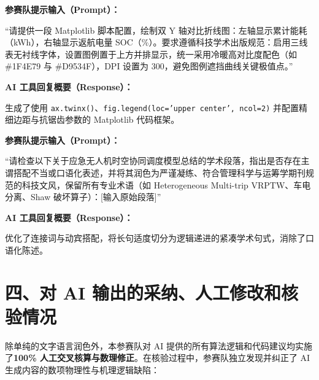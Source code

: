 \documentclass[fontset=windows, 12pt, a4paper]{ctexart}
\begin{document}
\begin{tcolorbox}[colback=cumcmgray, colframe=cumcmblue, title={\bfseries 典型交互示例 2：Matplotlib 学术图表配色与图例布局提示}]
  \textbf{参赛队提示输入（Prompt）：}\par
  “请提供一段 Matplotlib 脚本配置，绘制双 Y 轴对比折线图：左轴显示累计能耗（kWh），右轴显示返航电量 SOC（\%）。要求遵循科技学术出版规范：启用三线表无衬线字体，设置图例置于上方并排显示，统一采用冷暖高对比度配色（如 \#1F4E79 与 \#D9534F），DPI 设置为 300，避免图例遮挡曲线关键极值点。”\par
  \smallskip
  \textbf{AI 工具回复概要（Response）：}\par
  生成了使用 \texttt{ax.twinx()}、\texttt{fig.legend(loc='upper center', ncol=2)} 并配置精细边距与抗锯齿参数的 Matplotlib 代码框架。
\end{tcolorbox}

\begin{tcolorbox}[colback=cumcmgray, colframe=cumcmblue, title={\bfseries 典型交互示例 3：论文叙事逻辑与语言润色提示}]
  \textbf{参赛队提示输入（Prompt）：}\par
  “请检查以下关于应急无人机时空协同调度模型总结的学术段落，指出是否存在主谓搭配不当或口语化表述，并将其润色为严谨凝练、符合管理科学与运筹学期刊规范的科技文风，保留所有专业术语（如 Heterogeneous Multi-trip VRPTW、车电分离、Shaw 破坏算子）：[输入原始段落]”\par
  \smallskip
  \textbf{AI 工具回复概要（Response）：}\par
  优化了连接词与动宾搭配，将长句适度切分为逻辑递进的紧凑学术句式，消除了口语化陈述。
\end{tcolorbox}

\section*{四、对 AI 输出的采纳、人工修改和核验情况}

除单纯的文字语言润色外，本参赛队对 AI 提供的所有算法逻辑和代码建议均实施了\textbf{100\% 人工交叉核算与数理修正}。在核验过程中，参赛队独立发现并纠正了 AI 生成内容的数项物理性与机理逻辑缺陷：
\end{document}

